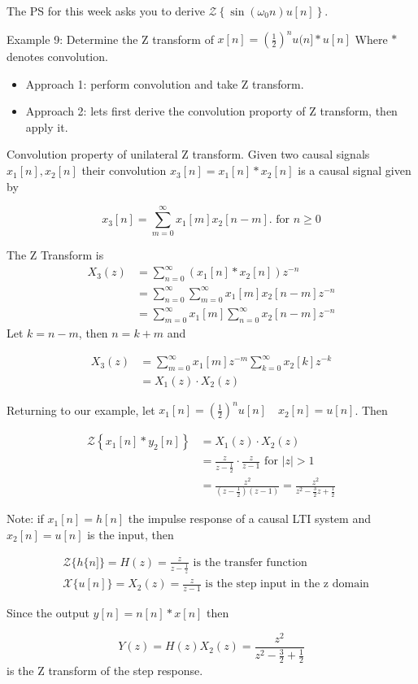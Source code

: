 \documentclass{article}
\begin{document}
The PS for this week asks you to derive $\mathcal{Z}\left\{\sin \left(\omega_0 n\right) u[n]\right\}$.

Example 9: Determine the Z transform of $x[n]=\left(\frac{1}{2}\right)^{n} u(n] \ast u[n]$ Where $\ast$ denotes convolution.

  \begin{itemize}
  \item Approach 1: perform convolution and take Z transform.\\
  \item Approach 2: lets first derive the convolution proporty of Z transform, then apply it.
  \end{itemize}

Convolution property of unilateral Z transform. Given two causal signals $x_{1}[n], x_{2}[n]$ their convolution $x_3[n] = x_{1}[n] * x_{2}[n]$ is a causal signal given by

$$
x_3[n] = \sum_{m=0}^{\infty} x_{1}[m] x_{2}[n-m] . \text { for } n \geq 0
$$

The Z Transform is
$$
\begin{aligned}
X_3(z) & =\sum_{n=0}^{\infty}\left(x_{1}[n] * x_{2}[n]\right) z^{-n}\\
& =\sum_{n=0}^{\infty} \sum_{m=0}^{\infty} x_{1}[m] x_{2}[n-m] z^{-n} \\
& =\sum_{m=0}^{\infty} x_{1}[m] \sum_{n=0}^{\infty} x_{2}[n-m] z^{-n}
\end{aligned}
$$
Let $k = n-m$, then $n = k+m$ and

$$
\begin{aligned}
X_3 (z) &=\sum_{m=0}^{\infty} x_{1}[m] z^{-m} \sum_{k=0}^{\infty} x_{2}[k] z^{-k} \\
& = X_{1}(z) \cdot X_{2}(z)
\end{aligned}
$$


Returning to our example, let $x_{1}[n]=\left(\frac{1}{2}\right)^{n} u[n] \quad x_{2}[n]=u[n]$. Then 

$$
\begin{aligned}
\mathcal{Z}\left\{x_{1}[n] * y_{2}[n]\right\} &= X_{1}(z) \cdot X_{2}(z)\\
& =\frac{z}{z-\frac{1}{2}} \cdot \frac{z}{z-1} \text { for }|z|>1 \\
& =\frac{z^{2}}{\left(z-\frac{1}{2}\right)(z-1)}=\frac{z^{2}}{z^{2}-\frac{3}{2} z+\frac{1}{2}}
\end{aligned}
$$

Note: if $x_{1}[n]=h[n]$ the impulse response of a causal LTI system and $x_{2}[n]=u[n]$ is the input, then

$$
\begin{aligned}
& \mathcal{Z}\{h\{n]\}=H(z)=\frac{z}{z-\frac{1}{z}} \text { is the transfer function } \\
& \mathcal{X}\{u[n]\}=X_{2}(z)=\frac{z}{z-1} \text { is the step input in the z domain}
\end{aligned}
$$

Since the output $y[n]=n[n] * x[n]$ then

$$
Y(z)=H(z) X_{2}(z)=\frac{z^{2}}{z^{2}-\frac{3}{2}+\frac{1}{2}}
$$
is the Z transform of the step response.
\end{document}
